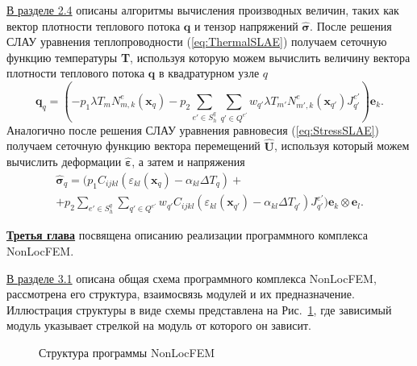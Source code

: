 \underline{В разделе 2.4} описаны алгоритмы вычисления производных величин, таких как вектор плотности теплового потока $\boldsymbol{q}$ и тензор напряжений $\widehat{\boldsymbol{\sigma}}$. После решения СЛАУ уравнения теплопроводности (\ref{eq:ThermalSLAE}) получаем сеточную функцию температуры \textbf{T}, используя которую можем вычислить величину вектора плотности теплового потока $\boldsymbol{q}$ в квадратурном узле $q$
\[
	\boldsymbol{q}_q = 
	\left(	
	-p_1 \lambda T_m N^e_{m,k} (\boldsymbol{x}_q)
	-p_2 \sum\limits_{e' \in S_h^q} \sum\limits_{q' \in Q^{e'}} w_{q'} \lambda T_{m'} N^e_{m',k} (\boldsymbol{x}_{q'}) J^{e'}_{q'}
	\right) \boldsymbol{e}_k.
\]
Аналогично после решения СЛАУ уравнения равновесия (\ref{eq:StressSLAE}) получаем сеточную функцию вектора перемещений  $\widehat{\boldsymbol{U}}$, используя который можем вычислить деформации $\widehat{\boldsymbol{\varepsilon}}$, а затем и напряжения
\begin{multline*}
	\widehat{\boldsymbol{\sigma}}_q =
	\Biggr(
	p_1 C_{ijkl} \left(\varepsilon_{kl} (\boldsymbol{x}_q) - \alpha_{kl} \Delta T_q \right)
	+\\+
	p_2 \sum\limits_{e' \in S_h^q} \sum\limits_{q' \in Q^{e'}} w_{q'} C_{ijkl} \left(\varepsilon_{kl} (\boldsymbol{x}_{q'}) - \alpha_{kl} \Delta T_{q'} \right) J^{e'}_{q'}
	\Biggr) \boldsymbol{e}_k \otimes \boldsymbol{e}_l.
\end{multline*}



\underline{\textbf{Третья глава}} посвящена описанию реализации программного комплекса NonLocFEM.

\underline{В разделе 3.1} описана общая схема программного комплекса NonLocFEM, рассмотрена его структура, взаимосвязь модулей и их предназначение. Иллюстрация структуры в виде схемы представлена на Рис.~\ref{pic:NonLocFEMSchema}, где зависимый модуль указывает стрелкой на модуль от которого он зависит.

\begin{figure}[ht]
    \caption{Структура программы NonLocFEM}\label{pic:NonLocFEMSchema}
\end{figure}

